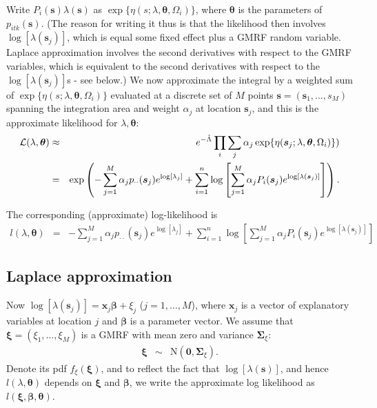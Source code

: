 \documentclass[a4paper]{article}
\begin{document}
Write $P_i(\boldsymbol{s})\lambda(\boldsymbol{s})$ as $\exp\{\eta(s;\lambda,\boldsymbol{\theta},\Omega_i)\}$, where $\boldsymbol{\theta}$ is the parameters of $p_{itk}(\boldsymbol{s})$. (The reason for writing it thus is that the likelihood then involves $\log\left[\lambda(\boldsymbol{s}_j)\right]$, which is equal some fixed effect plus a GMRF random variable. Laplace approximation involves the second derivatives with respect to the GMRF variables, which is equivalent to the second derivatives with respect to the $\log\left[\lambda(\boldsymbol{s}_j)\right]$s - see below.) We now approximate the integral by a weighted sum of $\exp\{\eta(s;\lambda,\boldsymbol{\theta},\Omega_i)\}$ evaluated at a discrete set of $M$ points $\boldsymbol{s}=(\boldsymbol{s}_1,\ldots,s_M)$ spanning the integration area and weight $\alpha_j$ at location $\boldsymbol{s}_j$, and this is the approximate likelihood for $\lambda,\boldsymbol{\theta}$:
\begin{eqnarray}
{\cal L}(\lambda,\boldsymbol{\theta})
&\approx&e^{-\tilde{\Lambda}}\prod_i\sum_j\alpha_j\exp\{\eta(\boldsymbol{s}_j;\lambda,\boldsymbol{\theta},\Omega_i)\}) 
\label{eq:L(lambda)} \\
&=&\exp
\left(
-\sum_{j=1}^M\alpha_jp_{\cdot\cdot}(\boldsymbol{s}_j)e^{\log[\lambda_j]}
+\sum_{i=1}^n\log
\left[
\sum_{j=1}^M\alpha_j
P_i(\boldsymbol{s}_j)e^{\log[\lambda(\boldsymbol{s}_j)]}
\right]
\right). \nonumber
\end{eqnarray}
\noindent

The corresponding (approximate) log-likelihood is
\begin{eqnarray}
l(\lambda,\boldsymbol{\theta})
&=&-\sum_{j=1}^M\alpha_jp_{\cdot\cdot}(\boldsymbol{s}_j)e^{\log[\lambda_j]}+\sum_{i=1}^n\log
\left[
\sum_{j=1}^M\alpha_j
P_i(\boldsymbol{s}_j)
e^{\log[
\lambda(\boldsymbol{s}_j)]
}
\right]
\end{eqnarray}

\subsection{Laplace approximation}

Now $\log\left[\lambda(\boldsymbol{s}_j)\right]=\boldsymbol{x}_j\boldsymbol{\beta}+\xi_j$ ($j=1,\ldots,M$), where $\boldsymbol{x}_j$ is a vector of explanatory variables at location $j$ and $\boldsymbol{\beta}$ is a parameter vector. We assume that $\boldsymbol{\xi}=(\xi_1,\ldots,\xi_M)$ is a GMRF with mean zero and variance $\boldsymbol{\Sigma}_\xi$:
\begin{eqnarray}
\boldsymbol{\xi}&\sim&\mbox{N}\left(\boldsymbol{0},\boldsymbol{\Sigma}_\xi\right).
\end{eqnarray}
Denote its pdf $f_\xi(\boldsymbol{\xi})$, and to reflect the fact that $\log\left[\lambda(\boldsymbol{s})\right]$, and hence $l(\lambda,\boldsymbol{\theta})$ depends on $\boldsymbol{\xi}$ and $\boldsymbol{\beta}$, we write the approximate log likelihood as $l(\boldsymbol{\xi},\boldsymbol{\beta},\boldsymbol{\theta})$.
\end{document}
